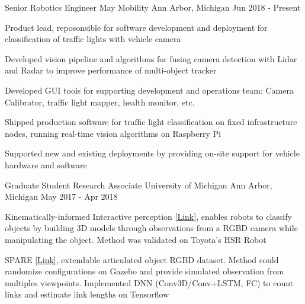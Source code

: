 \vspace{-2mm}

\begin{cventries}

  \cventry
    {Senior Robotics Engineer} %
    {May Mobility} %
    {Ann Arbor, Michigan} %
    {Jun 2018 - Present} %
    {
      \begin{cvitems} %
        \item {Product lead, reposonsible for software development and deployment for classification of traffic lights with vehicle camera}
        \item {Developed vision pipeline and algorithms for fusing camera detection with Lidar and Radar to improve performance of multi-object tracker}
        \item {Developed GUI tools for supporting development and operations team: Camera Calibrator, traffic light mapper, health monitor, etc.}
        \item {Shipped production software for  traffic light classification on fixed infrastructure nodes, running real-time vision algorithms on Raspberry Pi}
        \item {Supported new and existing deployments by providing on-site support for vehicle hardware and software}
      \end{cvitems}
    }

  \cventry
    {Graduate Student Research Associate} %
    {University of Michigan} %
    {Ann Arbor, Michigan} %
    {May 2017 - Apr 2018} %
    {
      \begin{cvitems} %
        \item {Kinematically-informed Interactive perception \href{https://arxiv.org/pdf/1901.05580}{[Link]}, enables robots to classify objects by building 3D models through observations from a RGBD camera while manipulating the object. Method was validated on Toyota’s HSR Robot}
        \item SPARE {\href{https://arxiv.org/pdf/1803.11147}{[Link]}, extendable articulated object RGBD dataset. Method could randomize configurations on Gazebo and provide simulated observation from multiples viewpoints. Implemented DNN (Conv3D/Conv+LSTM, FC) to count links and estimate link lengths on Tensorflow}
      \end{cvitems}
    }


\end{cventries}
